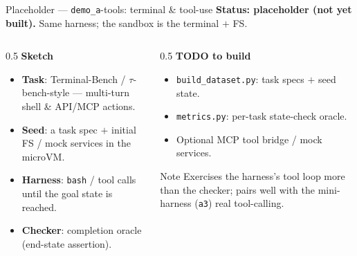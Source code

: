 \documentclass[aspectratio=169]{beamer}
\begin{document}
\begin{frame}{Placeholder --- \texttt{demo\_a}-tools: terminal \& tool-use}
  \footnotesize\textbf{Status: placeholder (not yet built).} Same harness; the sandbox is the terminal $+$ FS.
  \begin{columns}[T]
    \begin{column}{0.5\textwidth}
      \textbf{Sketch}
      \begin{itemize}\scriptsize\setlength\itemsep{0.1em}
        \item \textbf{Task}: Terminal-Bench / $\tau$-bench-style --- multi-turn shell \& API/MCP actions.
        \item \textbf{Seed}: a task spec $+$ initial FS / mock services in the microVM.
        \item \textbf{Harness}: \texttt{bash} / tool calls until the goal state is reached.
        \item \textbf{Checker}: completion oracle (end-state assertion).
      \end{itemize}
    \end{column}
    \begin{column}{0.5\textwidth}
      \textbf{TODO to build}
      \begin{itemize}\scriptsize\setlength\itemsep{0.1em}
        \item \texttt{build\_dataset.py}: task specs $+$ seed state.
        \item \texttt{metrics.py}: per-task state-check oracle.
        \item Optional MCP tool bridge / mock services.
      \end{itemize}
      \begin{block}{Note}
        \scriptsize Exercises the harness's tool loop more than the checker; pairs well with the
        mini-harness (\texttt{a3}) real tool-calling.
      \end{block}
    \end{column}
  \end{columns}
\end{frame}
\end{document}
